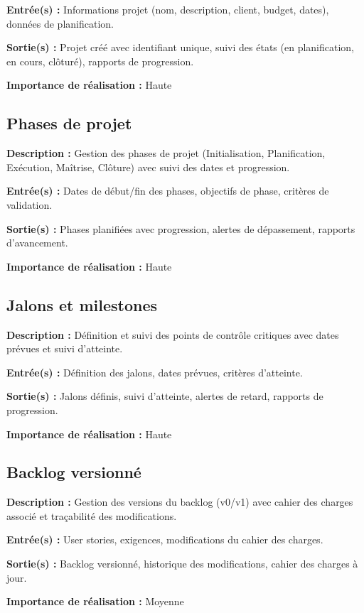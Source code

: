 \textbf{Entrée(s) :} Informations projet (nom, description, client, budget, dates), données de planification.

\textbf{Sortie(s) :} Projet créé avec identifiant unique, suivi des états (en planification, en cours, clôturé), rapports de progression.

\textbf{Importance de réalisation :} Haute

\subsection{Phases de projet}
\textbf{Description :} Gestion des phases de projet (Initialisation, Planification, Exécution, Maîtrise, Clôture) avec suivi des dates et progression.

\textbf{Entrée(s) :} Dates de début/fin des phases, objectifs de phase, critères de validation.

\textbf{Sortie(s) :} Phases planifiées avec progression, alertes de dépassement, rapports d'avancement.

\textbf{Importance de réalisation :} Haute

\subsection{Jalons et milestones}
\textbf{Description :} Définition et suivi des points de contrôle critiques avec dates prévues et suivi d'atteinte.

\textbf{Entrée(s) :} Définition des jalons, dates prévues, critères d'atteinte.

\textbf{Sortie(s) :} Jalons définis, suivi d'atteinte, alertes de retard, rapports de progression.

\textbf{Importance de réalisation :} Haute

\subsection{Backlog versionné}
\textbf{Description :} Gestion des versions du backlog (v0/v1) avec cahier des charges associé et traçabilité des modifications.

\textbf{Entrée(s) :} User stories, exigences, modifications du cahier des charges.

\textbf{Sortie(s) :} Backlog versionné, historique des modifications, cahier des charges à jour.

\textbf{Importance de réalisation :} Moyenne

